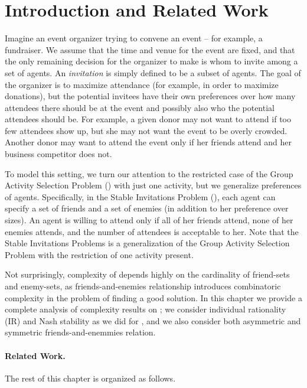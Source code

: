 \section{Introduction and Related Work}  \label{sec:SIP:intro}
Imagine an event organizer trying to convene an event -- for example,
a fundraiser. We assume that the time and venue for the event are fixed,
and that the only remaining decision for the organizer to make is whom
to invite among a set of agents.
An \emph{invitation} is simply defined to be a subset of agents.
The goal of the organizer is to maximize attendance (for example, 
in order to maximize donations), but the potential invitees have 
their own preferences over how many attendees there should be at the event 
and possibly also who the potential attendees should be.
For example, a given donor may not want to attend if too few attendees 
show up, but she may not want the event to be overly crowded. 
Another donor may want to attend the event only
if her friends attend and her business competitor does not.

To model this setting, we turn our attention to the restricted case of the Group Activity Selection Problem (\GASP) with just one activity, but we generalize preferences of agents. 
Specifically, in the Stable Invitations Problem (\SIP), each agent 
can specify a set of friends and a set of enemies (in addition to her preference over sizes).
An agent is willing to attend only if all of her friends attend, none of her enemies attends, and 
the number of attendees is acceptable to her. 
Note that the Stable Invitations Problems is a generalization of the Group Activity Selection Problem with the restriction of one activity present. 

Not surprisingly, complexity of \SIPs depends highly on the cardinality of friend-sets and enemy-sets, as friends-and-enemies relationship introduces combinatoric complexity in the problem of finding a good solution. 
In this chapter we provide a complete analysis of complexity results on \SIPs; we consider individual rationality (IR) and Nash stability as we did for \GASP, and we also consider both asymmetric and symmetric friends-and-enemmies relation. 

\paragraph{Related Work.} %


The rest of this chapter is organized as follows.

